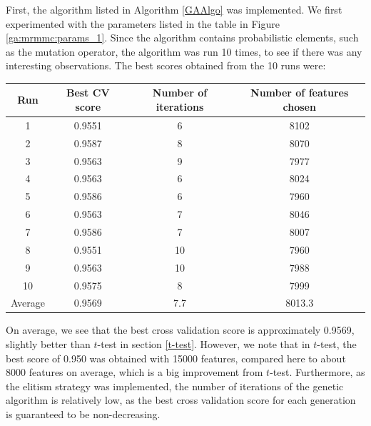 \documentclass[12pt, twoside, a4paper]{report}
\begin{document}
First, the algorithm listed in Algorithm \ref{GAAlgo} was implemented. We first experimented with the parameters listed in the table in Figure \ref{ga:mrmmc:params_1}. Since the algorithm contains probabilistic elements, such as the mutation operator, the algorithm was run 10 times, to see if there was any interesting observations. The best scores obtained from the 10 runs were:
\begin{center}
    \begin{tabular}{| c | c | c | c | } \hline
    Run & Best CV score & Number of iterations & Number of features chosen \\ \hline \hline
    1 & 0.9551 & 6 & 8102 \\ \hline
	2 & 0.9587 & 8 & 8070 \\ \hline
	3 & 0.9563 & 9 & 7977 \\ \hline
	4 & 0.9563 & 6 & 8024 \\ \hline
	5 & 0.9586 & 6 & 7960 \\ \hline
	6 & 0.9563 & 7 & 8046 \\ \hline
	7 & 0.9586 & 7 & 8007 \\ \hline
	8 & 0.9551 & 10 & 7960 \\ \hline
	9 & 0.9563 & 10 & 7988 \\ \hline
	10 & 0.9575 & 8 & 7999 \\ \hline
	Average & 0.9569 & 7.7 & 8013.3 \\ \hline
    \end{tabular}
\end{center}

On average, we see that the best cross validation score is approximately 0.9569, slightly better than $t$-test in section \ref{t-test}. However, we note that in $t$-test, the best score of 0.950 was obtained with 15000 features, compared here to about 8000 features on average, which is a big improvement from $t$-test. Furthermore, as the elitism strategy was implemented, the number of iterations of the genetic algorithm is relatively low, as the best cross validation score for each generation is guaranteed to be non-decreasing.
\end{document}
